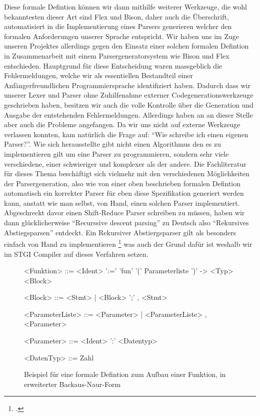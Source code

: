 \documentclass[a4paper, 12pt]{article}
\begin{document}
Diese formale Defintion k\"onnen wir dann mithilfe weiterer Werkzeuge, die wohl bekanntesten dieser Art sind Flex und Bison, daher auch die \"Uberschrift,
automatisiert in die Implementierung eines Parsers generieren welcher den formalen Anforderungen unserer Sprache entspricht. Wir
haben uns im Zuge unseren Projektes allerdings gegen den Einsatz einer solchen formalen Defintion in Zusammenarbeit mit einem Parsergeneratorsystem wie Bison
und Flex entschieden.
Hauptgrund f\"ur diese Entscheidung waren massgeblich die Fehlermeldungen, welche wir als essentiellen Bestandteil einer Anf\"angerfreundlichen Programmiersprache identifiziert haben. Dadurch dass wir unserer Lexer und Parser ohne Zuhilfenahme externer Codegenerationswerkzeuge
geschrieben haben, besitzen wir auch die volle Kontrolle \"uber die Generation
und Ausgabe der entstehenden Fehlermeldungen.
Allerdings haben an an dieser Stelle aber auch die Probleme angefangen. Da
wir uns nicht auf externe Werkzeuge verlassen konnten, kam nat\"urlich die
Frage auf: “Wie schreibe ich einen eigenen Parser?”. Wie sich herausstellte
gibt nicht einen Algorithmus den es zu implementieren gilt um eine Parser zu
programmieren, sondern sehr viele verschiedene, einer schwieriger und komplexer als der andere. Die Fachliteratur f\"ur dieses Thema besch\"aftigt sich
vielmehr mit den verschiedenen M\"oglichkeiten der Parsergeneration, also wie von
einer oben beschrieben formalen Defintion automatisch ein korrekter Parser f\"ur eben
diese Spezifikation generiert werden kann, anstatt wie man selbst, von Hand, einen solchen Parser implementiert.
Abgeschreckt davor einen Shift-Reduce Parser schreiben zu m\"ussen, haben
wir dann gl\"ucklicherweise “Recurssive descent parsing” zu Deutsch also “Rekursives Abstiegsparsen” entdeckt. Ein Rekursiver Abstiergsparser gilt als besonders einfach von Hand zu implementieren \footcite{recdec} was auch der Grund daf\"ur ist weshalb wir im STGI Compiler auf dieses Verfahren setzen.

\begin{figure}[h]
\caption{Beispiel f\"ur eine formale Defintion zum Aufbau einer Funktion,
in erweiterter Backaus-Naur-Form}
\setlength{\grammarparsep}{20pt plus 1pt minus 1pt}
\setlength{\grammarindent}{12em}

\begin{grammar}
<Funktion> ::= <Ident> ':=' 'fun' '(' Parameterliste ')' -> <Typ> <Block>

<Block> ::= <Stmt> | <Block> ';' , <Stmt>

<ParameterListe> ::= <Parameter> | <ParameterListe> , <Parameter>

<Parameter> ::= <Ident> ':' <Datentyp>

<DatenTyp> ::= Zahl
\end{grammar}
\end{figure}
\end{document}
